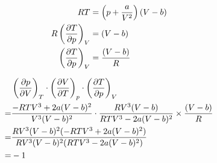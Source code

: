 \documentclass[10pt,\jkfside,a4paper]{article}
\begin{document}
\begin{enumerate}
\begin{equation}
\begin{split}
RT &= \left(p + \frac{a}{V^2}\right)(V - b) \\
R\left(\pdv{T}{p}\right)_V &= (V - b) \\
\left(\pdv{T}{p}\right)_V &= \frac{(V - b)}{R} \\
\end{split}
\end{equation}

\begin{equation}
\begin{split}
 & \left(\pdv{p}{V}\right)_T \cdot \left(\pdv{V}{T}\right)_p \cdot \left(\pdv{T}{p}\right)_V \\
=& \frac{- RTV^3 + 2a(V - b)^2}{V^3(V - b)^2} \cdot \frac{RV^3(V - b)}{RTV^3 - 2a(V - b)^2} \times \frac{(V - b)}{R} \\
=& \frac{RV^3(V - b)^2(-RTV^3 + 2a(V - b)^2)}{RV^3(V - b)^2(RTV^3 - 2a(V - b)^2)} \\
=& -1 \\
\end{split}
\end{equation}


\end{enumerate}
\end{document}
